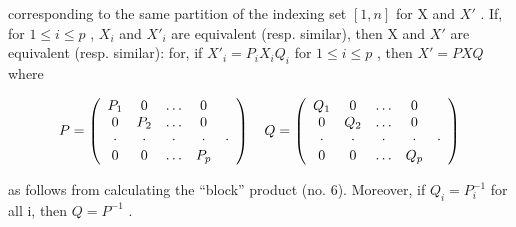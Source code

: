 corresponding to the same partition of the indexing set \([1, n]\) for X and \(X'\) . If, for \(1 \leqslant i \leqslant p\) , \(X_i\) and \(X'_i\) are equivalent (resp. similar), then X and \(X'\) are equivalent (resp. similar): for, if \(X'_i = P_i X_i Q_i\) for \(1 \leqslant i \leqslant p\) , then \(X' = PXQ\) where

\[
P = \left( \begin{array}{c c c c c} P _ {1} & 0 & \dots & 0 \\ 0 & P _ {2} & \dots & 0 \\ \cdot & \cdot & \cdot & \cdot & \cdot \\ 0 & 0 & \dots & P _ {p} \end{array} \right) \quad Q = \left( \begin{array}{c c c c c} Q _ {1} & 0 & \dots & 0 \\ 0 & Q _ {2} & \dots & 0 \\ \cdot & \cdot & \cdot & \cdot & \cdot \\ 0 & 0 & \dots & Q _ {p} \end{array} \right)
\]

as follows from calculating the ``block'' product (no. 6). Moreover, if \(Q_{i} = P_{i}^{-1}\) for all i, then \(Q = P^{-1}\) .

